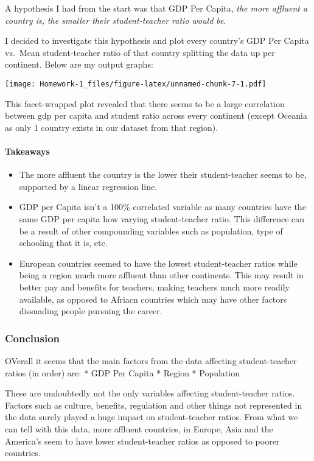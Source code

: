 \documentclass[
]{article}
\providecommand{\tightlist}{%
  \setlength{\itemsep}{0pt}\setlength{\parskip}{0pt}}
\begin{document}
A hypothesis I had from the start was that GDP Per Capita, \emph{the
more affluent a country is, the smaller their student-teacher ratio
would be}.

I decided to investigate this hypothesis and plot every country's GDP
Per Capita vs.~Mean student-teacher ratio of that country splitting the
data up per continent. Below are my output graphs:

\texttt{[image: Homework-1\_files/figure-latex/unnamed-chunk-7-1.pdf]}

This facet-wrapped plot revealed that there seems to be a large
correlation between gdp per capita and student ratio across every
continent (except Oceania as only 1 country exists in our dataset from
that region).

\hypertarget{takeaways}{%
\paragraph{Takeaways}\label{takeaways}}

\begin{itemize}
\tightlist
\item
  The more affluent the country is the lower their student-teacher seems
  to be, supported by a linear regression line.
\item
  GDP per Capita isn't a 100\% correlated variable as many countries
  have the same GDP per capita how varying student-teacher ratio. This
  difference can be a result of other compounding variables such as
  population, type of schooling that it is, etc.
\item
  European countries seemed to have the lowest student-teacher ratios
  while being a region much more affluent than other continents. This
  may result in better pay and benefits for teachers, making teachers
  much more readily available, as opposed to Afriacn countries which may
  have other factors dissuading people pursuing the career.
\end{itemize}

\hypertarget{conclusion}{%
\subsubsection{Conclusion}\label{conclusion}}

OVerall it seems that the main factors from the data affecting
student-teacher ratios (in order) are: * GDP Per Capita * Region *
Population

These are undoubtedly not the only variables affecting student-teacher
ratios. Factors such as culture, benefits, regulation and other things
not represented in the data surely played a huge impact on
student-teacher ratios. From what we can tell with this data, more
affluent countries, in Europe, Asia and the America's seem to have lower
student-teacher ratios as opposed to poorer countries.
\end{document}
